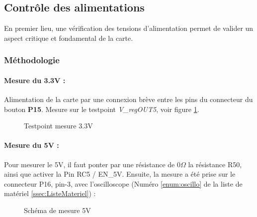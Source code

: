 \subsection{Contrôle des alimentations}
{
	En premier lieu, une vérification des tensions d'alimentation permet de valider un aspect critique et fondamental de la carte.
	\subsubsection{Méthodologie}
	\paragraph{Mesure du 3.3V :} Alimentation de la carte par une connexion brève entre les pins du connecteur du bouton \textbf{P15}. Mesure sur le testpoint \textit{V\_regOUT5}, voir figure \ref{fig:sch3}.
	\begin{figure}[h]
		\centering
		\caption{Testpoint mesure 3.3V}
		\label{fig:sch3}
	\end{figure}
	
	\paragraph{Mesure du 5V :} Pour mesurer le 5V, il faut ponter par une résistance de $0\Omega$ la résistance R50, ainsi que activer la Pin RC5 / EN\_5V. Ensuite, la mesure a été prise sur le connecteur P16, pin-3, avec l'oscilloscope (Numéro \ref{enum:oscillo} de la liste de matériel \ref{ssec:ListeMateriel}) :
	\begin{figure}[h]
		\centering
		\caption{Schéma de mesure 5V}
		\label{fig:sch5v}
	\end{figure}
	
}
